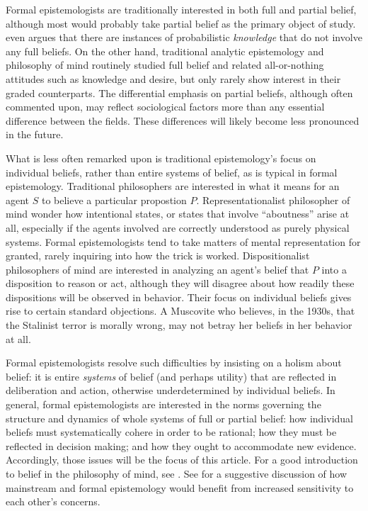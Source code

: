 Formal epistemologists are traditionally interested in both full and partial
belief, although most would probably take partial belief as the primary object
of study. \citet{moss2018probabilistic} even argues that there are instances of
probabilistic {\em knowledge} that do not involve any full beliefs.  On the
other hand, traditional analytic epistemology and philosophy of mind routinely
studied full belief and related all-or-nothing attitudes such as knowledge and
desire, but only rarely show interest in their graded counterparts. The
differential emphasis on partial beliefs, although often commented upon, may
reflect sociological factors more than any essential difference between the
fields. These differences will likely become less pronounced in the future.

What is less often remarked upon is traditional epistemology's focus on
individual beliefs, rather than entire systems of belief, as is typical in
formal epistemology. Traditional philosophers are interested in what it means
for an agent $S$ to believe a particular propostion $P$. Representationalist
philosopher of mind wonder how intentional states, or states that involve
``aboutness'' arise at all, especially if the agents involved are correctly
understood as purely physical systems. Formal epistemologists tend to take
matters of mental representation for granted, rarely inquiring into how the
trick is worked.  Dispositionalist philosophers of mind are interested in
analyzing an agent's belief that $P$ into a disposition to reason or act,
although they will disagree about how readily these dispositions will be
observed in behavior. Their focus on individual beliefs gives rise to certain
standard objections. A Muscovite who believes, in the 1930s, that the Stalinist
terror is morally wrong, may not betray her beliefs in her behavior at all.

Formal epistemologists resolve such difficulties by insisting on a holism about
belief: it is entire {\em systems} of belief (and perhaps utility) that are
reflected in deliberation and action, otherwise underdetermined by individual
beliefs. In general, formal epistemologists are interested in the norms
governing the structure and dynamics of whole systems of full or partial belief:
how individual beliefs must systematically cohere in order to be rational; how
they must be reflected in decision making; and how they ought to accommodate new
evidence. Accordingly, those issues will be the focus of this article. For a
good introduction to belief in the philosophy of mind, see \citet{sep-belief}.
See \citet{hajek2017tale} for a suggestive discussion of how mainstream and
formal epistemology would benefit from increased sensitivity to each other's
concerns.

